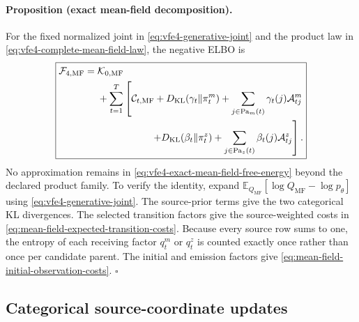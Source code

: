 \paragraph{Proposition (exact mean-field decomposition).}
For the fixed normalized joint in \cref{eq:vfe4-generative-joint} and the product law in \cref{eq:vfe4-complete-mean-field-law}, the negative ELBO is
\begin{equation}
\boxed{
\begin{aligned}
\mathcal F_{4,\mathrm{MF}}
={}&\mathcal K_{0,\mathrm{MF}}\\
&+\sum_{t=1}^{T}\left[
\mathcal C_{t,\mathrm{MF}}
+D_{\mathrm{KL}}(\gamma_t\Vert\pi_t^m)
+\sum_{j\in\operatorname{Pa}_m(t)}
\gamma_t(j)\mathcal A_{tj}^m
\right.\\
&\left.\hspace{5.5em}
+D_{\mathrm{KL}}(\beta_t\Vert\pi_t^z)
+\sum_{j\in\operatorname{Pa}_z(t)}
\beta_t(j)\mathcal A_{tj}^z
\right].
\end{aligned}}
\label{eq:vfe4-exact-mean-field-free-energy}
\end{equation}
No approximation remains in \cref{eq:vfe4-exact-mean-field-free-energy} beyond the declared product family. To verify the identity, expand $\mathbb E_{Q_{\mathrm{MF}}}[\log Q_{\mathrm{MF}}-\log p_\theta]$ using \cref{eq:vfe4-generative-joint}. The source-prior terms give the two categorical KL divergences. The selected transition factors give the source-weighted costs in \cref{eq:mean-field-expected-transition-costs}. Because every source row sums to one, the entropy of each receiving factor $q_t^m$ or $q_t^z$ is counted exactly once rather than once per candidate parent. The initial and emission factors give \cref{eq:mean-field-initial-observation-costs}. \hfill$\square$

\subsection{Categorical source-coordinate updates}

